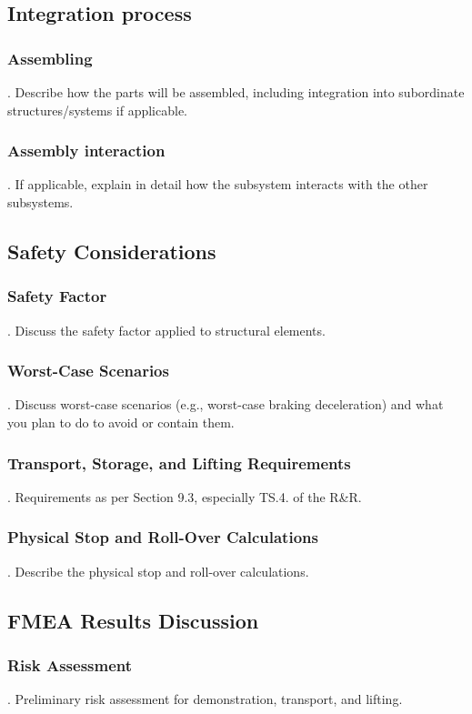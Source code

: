\documentclass{article}
\begin{document}
\subsection{Integration process}
\subsubsection{Assembling}
.  Describe how the parts will be assembled, including integration into subordinate structures/systems if applicable.
\subsubsection{Assembly interaction}
.  If applicable, explain in detail how the subsystem interacts with the other subsystems.



\subsection{Safety Considerations}
\subsubsection{Safety Factor}
.  Discuss the safety factor applied to structural elements.
\subsubsection{Worst-Case Scenarios}
.  Discuss worst-case scenarios (e.g., worst-case braking deceleration) and what you plan to do to avoid or contain them.
\subsubsection{Transport, Storage, and Lifting Requirements}
.  Requirements as per Section 9.3, especially TS.4. of the R\&R.
\subsubsection{Physical Stop and Roll-Over Calculations}
.  Describe the physical stop and roll-over calculations.


\subsection{FMEA Results Discussion}
\subsubsection{Risk Assessment}
.  Preliminary risk assessment for demonstration, transport, and lifting.
\end{document}
